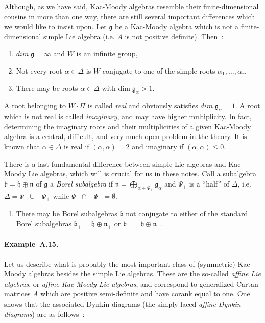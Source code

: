 \documentclass[a4paper,10pt]{amsart}
\def\dim{\mathrm{dim}}
\def\a{\alpha}
\def\g{\mathfrak{g}}
\def\bo{\mathfrak{b}}
\def\h{\mathfrak{h}}
\def\n{\mathfrak{n}}
\numberwithin{equation}{section}
\begin{document}
{\vspace{.25in}

Although, as we have said, Kac-Moody algebras resemble their finite-dimensional cousins in more than one way, there are still several important differences which we would like to insist upon. Let $\g$ be a Kac-Moody algebra which is not a finite-dimensional simple Lie algebra (i.e. $A$ is not positive definite). Then~:
\begin{enumerate}
\item[i)]  ${dim}\;\g=\infty$ and $W$ is an infinite group,
\item[ii)]  Not every root $\a \in \Delta$ is $W$-conjugate to one of the simple roots $\a_1, \ldots , \a_r$,
\item[iii)] There may be roots $\a \in \Delta$ with $\dim\;\g_{\a} >1$.
\end{enumerate}

\vspace{.1in}

A root belonging to $W \cdot \Pi$ is called \textit{real} and obviously satisfies ${dim}\;\g_{\a}=1$. A root which is not real is called \textit{imaginary}, and may have higher multiplicity. In fact, determining the imaginary roots and their multiplicities of a given Kac-Moody algebra is a central, difficult, and very much open problem in the theory. It is known that $\a \in \Delta$ is real if $( \a,\a )=2$ and imaginary if $( \a,\a ) \leq 0$.

\vspace{.1in}

There is a last fundamental difference between simple Lie algebras and Kac-Moody Lie algebras, which will is crucial for us in these notes. Call a subalgebra $\bo=\h \oplus \n$ of $\g$ a \textit{Borel subalgebra} if $\n=\bigoplus_{\a \in \Psi_+} \g_{\a}$ and $\Psi_+$ is a ``half'' of $\Delta$, i.e. $\Delta=\Psi_+ \cup -\Psi_+$ while $\Psi_+ \cap -\Psi_+ = \emptyset$.
\begin{enumerate}
\item[iv)] There may be Borel subalgebras $\mathfrak{b}$ not conjugate to either of the standard Borel subalgebras $\bo_+=\h \oplus \n_+$ or $\bo_-=\h \oplus \n_-$.
\end{enumerate}

\vspace{.15in}

\addtocounter{theo}{1}

\paragraph{\textbf{Example~A.15.}} Let us describe what is probably the most important class of (symmetric) Kac-Moody algebras besides the simple Lie algebras. These are the so-called \textit{affine Lie algebras}, or \textit{affine Kac-Moody Lie algebras}, and correspond to generalized Cartan matrices $A$ which are positive semi-definite and have corank equal to one. One shows that the associated Dynkin diagrams (the simply laced \textit{affine Dynkin diagrams}) are as follows~:

}
\end{document}
